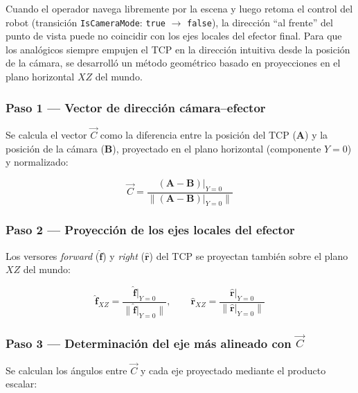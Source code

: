 Cuando el operador navega libremente por la escena y luego retoma el control del
robot (transición \texttt{IsCameraMode}: \texttt{true} $\to$ \texttt{false}), la
dirección ``al frente'' del punto de vista puede no coincidir con los ejes locales
del efector final. Para que los analógicos siempre empujen el TCP en la dirección
intuitiva desde la posición de la cámara, se desarrolló un método geométrico
basado en proyecciones en el plano horizontal $XZ$ del mundo.

\subsubsection*{Paso 1 --- Vector de dirección cámara--efector}

Se calcula el vector $\overrightarrow{C}$ como la diferencia entre la posición
del TCP ($\mathbf{A}$) y la posición de la cámara ($\mathbf{B}$), proyectado
en el plano horizontal (componente $Y = 0$) y normalizado:

\begin{equation}
    \overrightarrow{C} = \frac{(\mathbf{A} - \mathbf{B})\big|_{Y=0}}
                              {\|(\mathbf{A} - \mathbf{B})\big|_{Y=0}\|}
    \label{eq:vecC}
\end{equation}

\subsubsection*{Paso 2 --- Proyección de los ejes locales del efector}

Los versores \emph{forward} ($\hat{\mathbf{f}}$) y \emph{right} ($\hat{\mathbf{r}}$)
del TCP se proyectan también sobre el plano $XZ$ del mundo:

\begin{equation}
    \hat{\mathbf{f}}_{XZ} = \frac{\hat{\mathbf{f}}\big|_{Y=0}}{\|\hat{\mathbf{f}}\big|_{Y=0}\|},
    \qquad
    \hat{\mathbf{r}}_{XZ} = \frac{\hat{\mathbf{r}}\big|_{Y=0}}{\|\hat{\mathbf{r}}\big|_{Y=0}\|}
    \label{eq:proj_axes}
\end{equation}

\subsubsection*{Paso 3 --- Determinación del eje más alineado con $\overrightarrow{C}$}

Se calculan los ángulos entre $\overrightarrow{C}$ y cada eje proyectado mediante
el producto escalar:

